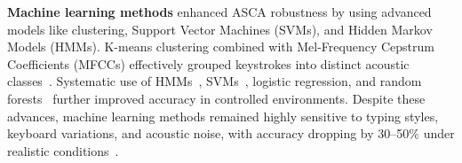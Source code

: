 \textbf{Machine learning methods} enhanced ASCA robustness by using advanced models like clustering, Support Vector Machines (SVMs), and Hidden Markov Models (HMMs). K-means clustering combined with Mel-Frequency Cepstrum Coefficients (MFCCs) effectively grouped keystrokes into distinct acoustic classes~\cite{wit2014all}. Systematic use of HMMs~\cite{zhuang2009keyboard}, SVMs~\cite{wang2016accurate}, logistic regression, and random forests~\cite{anand2018keyboard} further improved accuracy in controlled environments. Despite these advances, machine learning methods remained highly sensitive to typing styles, keyboard variations, and acoustic noise, with accuracy dropping by 30–50\% under realistic conditions~\cite{halevi2012closer, fang2018no, liu2015snooping}.


